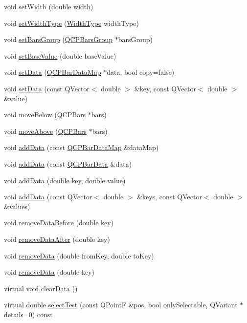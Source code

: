 \begin{DoxyCompactItemize}
\item 
void \hyperlink{classQCPBars_afec6116579d44d5b706e0fa5e5332507}{set\+Width} (double width)
\item 
void \hyperlink{classQCPBars_adcaa3b41281bb2c0f7949b341592fcc0}{set\+Width\+Type} (\hyperlink{classQCPBars_a65dbbf1ab41cbe993d71521096ed4649}{Width\+Type} width\+Type)
\item 
void \hyperlink{classQCPBars_aedd1709061f0b307c47ddb45e172ef9a}{set\+Bars\+Group} (\hyperlink{classQCPBarsGroup}{Q\+C\+P\+Bars\+Group} $\ast$bars\+Group)
\item 
void \hyperlink{classQCPBars_a574ec7eb7537566df1a28ff085d75623}{set\+Base\+Value} (double base\+Value)
\item 
void \hyperlink{classQCPBars_aa3435aab19e0a49e4e7b41bd36a8d96b}{set\+Data} (\hyperlink{qcustomplot_8h_aa846c77472cae93def9f1609d0c57191}{Q\+C\+P\+Bar\+Data\+Map} $\ast$data, bool copy=false)
\item 
void \hyperlink{classQCPBars_a3efded5df4a82ecb201f7c28099fa2e5}{set\+Data} (const Q\+Vector$<$ double $>$ \&key, const Q\+Vector$<$ double $>$ \&value)
\item 
void \hyperlink{classQCPBars_a69fc371346980f19177c3d1ecdad78ee}{move\+Below} (\hyperlink{classQCPBars}{Q\+C\+P\+Bars} $\ast$bars)
\item 
void \hyperlink{classQCPBars_ac22e00a6a41509538c21b04f0a57318c}{move\+Above} (\hyperlink{classQCPBars}{Q\+C\+P\+Bars} $\ast$bars)
\item 
void \hyperlink{classQCPBars_a1f29cf08615040993209147fa68de3f2}{add\+Data} (const \hyperlink{qcustomplot_8h_aa846c77472cae93def9f1609d0c57191}{Q\+C\+P\+Bar\+Data\+Map} \&data\+Map)
\item 
void \hyperlink{classQCPBars_a142158b1addefd53259002dd3ab22c3a}{add\+Data} (const \hyperlink{classQCPBarData}{Q\+C\+P\+Bar\+Data} \&data)
\item 
void \hyperlink{classQCPBars_a684dd105403a5497fda42f2094fecbb7}{add\+Data} (double key, double value)
\item 
void \hyperlink{classQCPBars_a3679a0a9decab0fa03f8f4c6e3344d52}{add\+Data} (const Q\+Vector$<$ double $>$ \&keys, const Q\+Vector$<$ double $>$ \&values)
\item 
void \hyperlink{classQCPBars_a9d12779a3fad4820aad2c428f368298d}{remove\+Data\+Before} (double key)
\item 
void \hyperlink{classQCPBars_a99de6e7abbbf03fb41fa604c7f08aa8b}{remove\+Data\+After} (double key)
\item 
void \hyperlink{classQCPBars_a1fe9bcb57d670defea1bb65cadf43765}{remove\+Data} (double from\+Key, double to\+Key)
\item 
void \hyperlink{classQCPBars_a837cc9848ad3edd40a6130b508493f93}{remove\+Data} (double key)
\item 
virtual void \hyperlink{classQCPBars_a11dbbd707132f07f862dff13c5789c2b}{clear\+Data} ()
\item 
virtual double \hyperlink{classQCPBars_a0d37a9feb1d0baf73ce6e809db214445}{select\+Test} (const Q\+Point\+F \&pos, bool only\+Selectable, Q\+Variant $\ast$details=0) const 
\end{DoxyCompactItemize}
